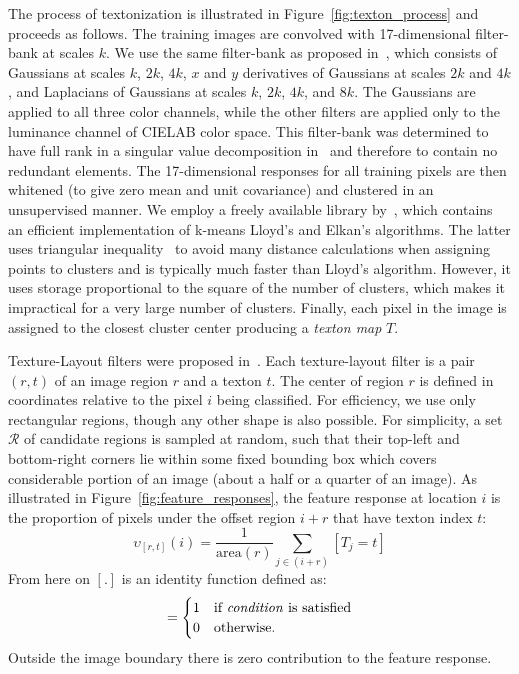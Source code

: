 The process of textonization is illustrated in Figure~\ref{fig:texton_process} and proceeds as follows. The training 
images are convolved with 17-dimensional filter-bank at scales $ k $. We use the same filter-bank as proposed in~\cite{Winn1992},
which consists of Gaussians at scales $ k $, $ 2k $, $ 4k $, $ x $ and $ y $ derivatives of Gaussians at scales $ 2k $ and $ 4k $, 
and Laplacians of Gaussians at scales $ k $, $ 2k $, $ 4k $, and $ 8k $. The Gaussians are applied to all three color channels,
while the other filters are applied only to the luminance channel of CIELAB color space. This filter-bank was determined to have 
full rank in a singular value decomposition in~\cite{Jones1992} and therefore to contain no redundant elements. The 17-dimensional
responses for all training pixels are then whitened (to give zero mean and unit covariance) and clustered in an unsupervised manner.
We employ a freely available library by~\cite{vedaldi08vlfeat}, which contains an efficient implementation of k-means Lloyd's
and Elkan's algorithms. The latter uses triangular inequality~\cite{Elkan2003} to avoid many distance calculations when 
assigning points to clusters and is typically much faster than Lloyd's algorithm. However, it uses storage 
proportional to the square of the number of clusters, which makes it impractical for a very large number of clusters.
Finally, each pixel in the image is assigned to the closest cluster center producing a \emph{texton map} $ T $.

Texture-Layout filters were proposed in~\cite{Shotton2009}. Each texture-layout filter is a pair $ (r, t) $ of an image
region $ r $ and a texton $ t $. The center of region $ r $ is defined in coordinates relative to the pixel $ i $
being classified. For efficiency, we use only rectangular regions, though any other shape is also possible.
For simplicity, a set $ \mathcal{R} $ of candidate regions is sampled at random, such that their top-left and bottom-right corners
lie within some fixed bounding box which covers considerable portion of an image (about a half or a quarter of an image).
As illustrated in Figure~\ref{fig:feature_responses}, the feature response at location $ i $ is the proportion of pixels under the 
offset region $ i + r $ that have texton index $ t $:
\begin{equation}
 \upsilon_{[r, t]}(i) = \frac{1}{\text{area}(r)} \sum_{j \in (i + r)} [T_j = t]
\end{equation}
From here on $[ . ]$ is an identity function defined as:
\begin{equation}
 [ condition ] = \begin{cases} 1 & \text{if \emph{condition} is satisfied} \\
                0 & \text{otherwise.}
               \end{cases}
\end{equation}
Outside the image boundary there is zero contribution to the feature response.

